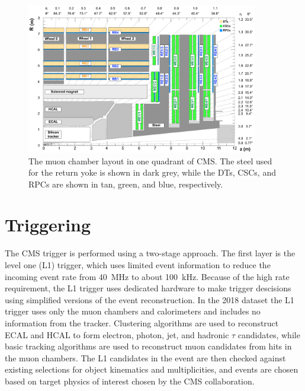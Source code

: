 \begin{figure}[h]
    \includegraphics[width=0.9\textwidth]{figures/cms_quadrant_run_ii.pdf}
    \centering
    \caption[Muon chamber layout in Run 2]{The muon chamber layout in one quadrant of CMS. The steel used for the return yoke is shown in dark grey, while the DTs, CSCs, and RPCs are shown in tan, green, and blue, respectively.}
    \label{fig:cscLayout}
\end{figure}

\section{Triggering}
The CMS trigger is performed using a two-stage approach. The first layer is the level one (L1) trigger, which uses limited event information to reduce the incoming event rate from \SI{40}{\mega\hertz} to about \SI{100}{\kilo\hertz}. 
Because of the high rate requirement, the L1 trigger uses dedicated hardware to make trigger descisions using simplified versions of the event reconstruction.
In the 2018 dataset the L1 trigger uses only the muon chambers and calorimeters and includes no information from the tracker.
Clustering algorithms are used to reconstruct ECAL and HCAL to form electron, photon, jet, and hadronic $\tau$ candidates, while basic tracking algorithms are used to reconstruct muon candidates from hits in the muon chambers.
The L1 candidates in the event are then checked against existing selections for object kinematics and multiplicities, and events are chosen based on target physics of interest chosen by the CMS collaboration.

